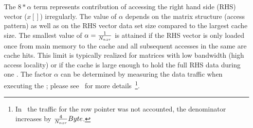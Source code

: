 The $8*\alpha$ term represents contribution of accessing the right hand side (RHS) vector ($x[]$) irregularly. The value of $\alpha$ depends on the matrix structure (access pattern) as well as on the RHS vector data set size compared to the largest cache size. The smallest value of $\alpha=\frac{1}{N_{nzr}}$ is attained if the RHS vector is only loaded once from main memory to the cache and all subsequent accesses in the same \SpMV are cache hits. This limit is typically realized for matrices with low bandwidth (high access locality) or if the cache is large enough to hold the full RHS data during one \SpMV. The factor $\alpha$ can be determined by measuring the data traffic when executing the \SpMV; please see~\cite{Moritz_sell} for more details~\footnote{In~\cite{Moritz_sell} the traffic for the row pointer was not accounted, \ie the denominator increases by $\frac{4}{N_{nzr}} Byte$.}.

\begin{comment}
\subsubsection{\SpMTV}
Sparse Matrix Transpose Vector (\SpMTV) is a kernel having \DTWO dependency.
\begin{algorithm}[H]
	\caption{SpMTV Find $b$ : $b=A'x$} 
	\label{alg:SpMTV}
	\begin{algorithmic}[1]
		\FOR{$row=1:nrows$}
		\FOR{$idx=rowPtr[row]:rowPtr[row+1]$}
		\STATE{$b[col[idx]] += A[idx]*x[row]$} 
		\ENDFOR
		\ENDFOR
	\end{algorithmic}
\end{algorithm}
In comparison to SpMV operation, the kernel requires an extra scatter operation, which causes dependency. The arithmetic intensity of the kernel $I_\mathrm{\SpMTV}$ is given as:
\begin{equation}
\label{eq:SpMTV_intensity}
I_\mathrm{\SpMTV} (\alpha)= \frac{2}{8+4+16*\alpha+\frac{8}{\NNZRmath}} \\
\end{equation}
In ideal case data traffic for this kernel should remain close to that of SpMV, if \NNZR are sufficiently high, and $\alpha$ factor is small enough.
\end{comment}


